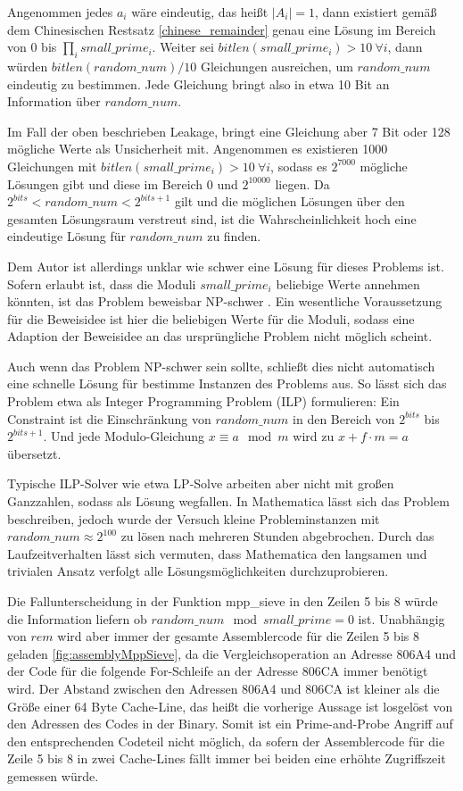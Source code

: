 Angenommen jedes $a_i$ wäre eindeutig, das heißt $|A_i|=1$, dann existiert gemäß dem Chinesischen Restsatz \ref{chinese_remainder} genau eine Lösung im Bereich von $0$ bis $\prod_i small\_prime_i$.
Weiter sei $bitlen(small\_prime_i) > 10 \: \forall i$, dann würden $bitlen(random\_num)/10$ Gleichungen ausreichen, um $random\_num$ eindeutig zu bestimmen.
Jede Gleichung bringt also in etwa 10 Bit an Information über $random\_num$.

Im Fall der oben beschrieben Leakage, bringt eine Gleichung aber 7 Bit oder 128 mögliche Werte als Unsicherheit mit.
Angenommen es existieren 1000 Gleichungen mit $bitlen(small\_prime_i) > 10 \: \forall i$, sodass es $2^{7000}$ mögliche Lösungen gibt und diese im Bereich 0 und $2^{10000}$ liegen.
Da $2^{bits} < random\_num < 2^{bits+1}$ gilt und die möglichen Lösungen über den gesamten Lösungsraum verstreut sind, ist die Wahrscheinlichkeit hoch eine eindeutige Lösung für $random\_num$ zu finden.

Dem Autor ist allerdings unklar wie schwer eine Lösung für dieses Problems ist.
Sofern erlaubt ist, dass die Moduli $small\_prime_i$ beliebige Werte annehmen könnten, ist das Problem beweisbar NP-schwer \cite{FuzzyCRTProof}.
Ein wesentliche Voraussetzung für die Beweisidee ist hier die beliebigen Werte für die Moduli, sodass eine Adaption der Beweisidee an das ursprüngliche Problem nicht möglich scheint.

Auch wenn das Problem NP-schwer sein sollte, schließt dies nicht automatisch eine schnelle Lösung für bestimme Instanzen des Problems aus.
So lässt sich das Problem etwa als Integer Programming Problem (ILP) formulieren:
Ein Constraint ist die Einschränkung von $random\_num$ in den Bereich von $2^{bits}$ bis $2^{bits+1}$.
Und jede Modulo-Gleichung $x \equiv a \mod m$ wird zu $x + f \cdot m = a$ übersetzt.

Typische ILP-Solver wie etwa LP-Solve arbeiten aber nicht mit großen Ganzzahlen, sodass als Lösung wegfallen.
In Mathematica lässt sich das Problem beschreiben, jedoch wurde der Versuch kleine Probleminstanzen mit $random\_num \approx 2^100$ zu lösen nach mehreren Stunden abgebrochen.
Durch das Laufzeitverhalten lässt sich vermuten, dass Mathematica den langsamen und trivialen Ansatz verfolgt alle Lösungsmöglichkeiten durchzuprobieren.

Die Fallunterscheidung in der Funktion mpp_sieve in den Zeilen 5 bis 8 würde die Information liefern ob $random\_num \mod small\_prime = 0$ ist.
Unabhängig von $rem$ wird aber immer der gesamte Assemblercode für die Zeilen 5 bis 8 geladen \ref{fig:assemblyMppSieve}, da die Vergleichsoperation an Adresse 806A4 und der Code für die folgende For-Schleife an der Adresse 806CA immer benötigt wird.
Der Abstand zwischen den Adressen 806A4 und 806CA ist kleiner als die Größe einer 64 Byte Cache-Line, das heißt die vorherige Aussage ist losgelöst von den Adressen des Codes in der Binary.
Somit ist ein Prime-and-Probe Angriff auf den entsprechenden Codeteil nicht möglich, da sofern der Assemblercode für die Zeile 5 bis 8 in zwei Cache-Lines fällt immer bei beiden eine erhöhte Zugriffszeit gemessen würde.

